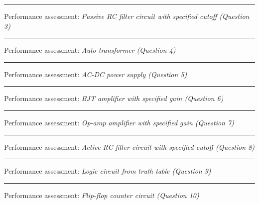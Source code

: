 \vskip 10pt
\hrule \vskip 5pt
\noindent
{}

\hskip 10pt Performance assessment: {\it Passive RC filter circuit with specified cutoff (Question 3)}
 
\vskip 10pt
\hrule \vskip 5pt
\noindent
{}

\hskip 10pt Performance assessment: {\it Auto-transformer (Question 4)}
 
\vskip 10pt
\hrule \vskip 5pt
\noindent
{}

\hskip 10pt Performance assessment: {\it AC-DC power supply (Question 5)}
 
\vskip 10pt
\hrule \vskip 5pt
\noindent
{}

\hskip 10pt Performance assessment: {\it BJT amplifier with specified gain (Question 6)}
 
\vskip 10pt
\hrule \vskip 5pt
\noindent
{}

\hskip 10pt Performance assessment: {\it Op-amp amplifier with specified gain (Question 7)}
 
\vskip 10pt
\hrule \vskip 5pt
\noindent
{}

\hskip 10pt Performance assessment: {\it Active RC filter circuit with specified cutoff (Question 8)}
 
\vskip 10pt
\hrule \vskip 5pt
\noindent
{}

\hskip 10pt Performance assessment: {\it Logic circuit from truth table (Question 9)}
 
\vskip 10pt
\hrule \vskip 5pt
\noindent
{}

\hskip 10pt Performance assessment: {\it Flip-flop counter circuit (Question 10)}
 
\vskip 10pt





\vfil \eject

